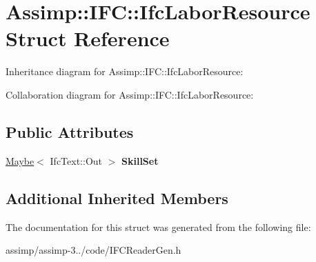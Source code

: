 \hypertarget{struct_assimp_1_1_i_f_c_1_1_ifc_labor_resource}{\section{Assimp\+:\+:I\+F\+C\+:\+:Ifc\+Labor\+Resource Struct Reference}
\label{struct_assimp_1_1_i_f_c_1_1_ifc_labor_resource}
}


Inheritance diagram for Assimp\+:\+:I\+F\+C\+:\+:Ifc\+Labor\+Resource\+:


Collaboration diagram for Assimp\+:\+:I\+F\+C\+:\+:Ifc\+Labor\+Resource\+:
\subsection*{Public Attributes}
\begin{DoxyCompactItemize}
\item 
\hypertarget{struct_assimp_1_1_i_f_c_1_1_ifc_labor_resource_aae80b384b59568c1a1d5c091d6cd2e3a}{\hyperlink{struct_assimp_1_1_s_t_e_p_1_1_maybe}{Maybe}$<$ Ifc\+Text\+::\+Out $>$ {\bfseries Skill\+Set}}\label{struct_assimp_1_1_i_f_c_1_1_ifc_labor_resource_aae80b384b59568c1a1d5c091d6cd2e3a}

\end{DoxyCompactItemize}
\subsection*{Additional Inherited Members}


The documentation for this struct was generated from the following file\+:\begin{DoxyCompactItemize}
\item 
assimp/assimp-\/3../code/I\+F\+C\+Reader\+Gen.\+h\end{DoxyCompactItemize}
